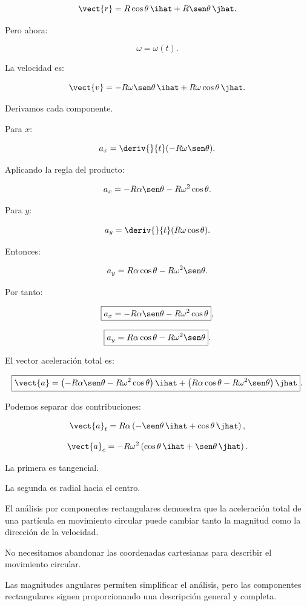 \[
\vect{r}
=
R\cos\theta\,\ihat
+
R\sen\theta\,\jhat.
\]

Pero ahora:

\[
\omega=\omega(t).
\]

La velocidad es:

\[
\vect{v}
=
-R\omega\sen\theta\,\ihat
+
R\omega\cos\theta\,\jhat.
\]

Derivamos cada componente.

Para \(x\):

\[
a_x
=
\deriv{}{t}
(-R\omega\sen\theta).
\]

Aplicando la regla del producto:

\[
a_x
=
-R\alpha\sen\theta
-
R\omega^2\cos\theta.
\]

Para \(y\):

\[
a_y
=
\deriv{}{t}
(R\omega\cos\theta).
\]

Entonces:

\[
a_y
=
R\alpha\cos\theta
-
R\omega^2\sen\theta.
\]

Por tanto:

\[
\boxed{
a_x
=
-R\alpha\sen\theta
-
R\omega^2\cos\theta
},
\]

\[
\boxed{
a_y
=
R\alpha\cos\theta
-
R\omega^2\sen\theta
}.
\]

El vector aceleración total es:

\[
\boxed{
\vect{a}
=
\left(
-R\alpha\sen\theta-R\omega^2\cos\theta
\right)\ihat
+
\left(
R\alpha\cos\theta-R\omega^2\sen\theta
\right)\jhat
}.
\]

Podemos separar dos contribuciones:

\[
\vect{a}_t
=
R\alpha
\left(
-\sen\theta\,\ihat+\cos\theta\,\jhat
\right),
\]

\[
\vect{a}_c
=
-R\omega^2
\left(
\cos\theta\,\ihat+\sen\theta\,\jhat
\right).
\]

La primera es tangencial.

La segunda es radial hacia el centro.

\begin{interpretacion}

El análisis por componentes rectangulares demuestra que la aceleración total
de una partícula en movimiento circular puede cambiar tanto la magnitud como
la dirección de la velocidad.

No necesitamos abandonar las coordenadas cartesianas para describir el
movimiento circular.

Las magnitudes angulares permiten simplificar el análisis, pero las
componentes rectangulares siguen proporcionando una descripción general y
completa.

\end{interpretacion}


